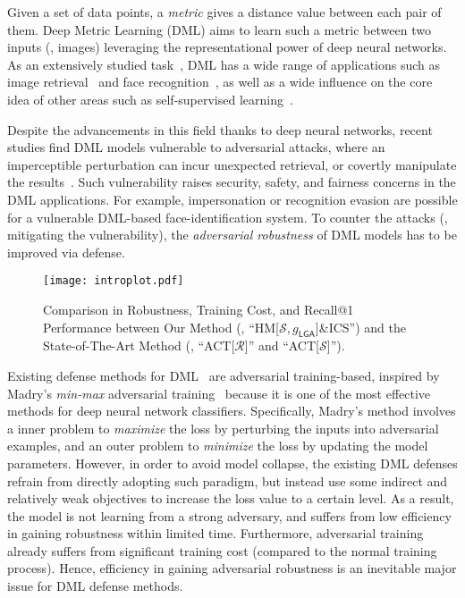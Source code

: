 \documentclass[10pt,twocolumn,letterpaper]{article}
\begin{document}

Given a set of data points, a \emph{metric} gives a distance value between each
pair of them.
%
Deep Metric Learning (DML) aims to learn such a metric between two inputs (\eg,
images) leveraging the representational power of deep neural networks.
%
As an extensively studied task~\cite{revisiting}, DML has a wide range of
applications such as image retrieval~\cite{imagesim2} and face
recognition~\cite{facenet,domainface}, as well as a wide influence on the core
idea of other areas such as self-supervised learning~\cite{dmlreality}.

Despite the advancements in this field thanks to deep neural
networks, recent studies find DML models vulnerable to
adversarial attacks, where an imperceptible perturbation can incur unexpected
retrieval, or covertly manipulate the results~\cite{advrank,advorder}.
%
Such vulnerability raises security, safety, and fairness concerns in the
DML applications.
%
For example, impersonation or recognition evasion are possible for a
vulnerable DML-based face-identification system.
%
To counter the attacks (\ie, mitigating the vulnerability), the
\emph{adversarial robustness} of DML models has to be improved via defense.

\begin{figure}[t]
	\texttt{[image: introplot.pdf]}
	\caption{
		Comparison in Robustness, Training Cost, and Recall@1 Performance
		between Our Method (\ie, ``HM[$\mathcal{S},g_\mathsf{LGA}$]\&ICS'')
		and the State-of-The-Art Method (\ie, ``ACT[$\mathcal{R}$]'' and
		``ACT[$\mathcal{S}$]'').
	}
	\label{fig:introplot}
\end{figure}


Existing defense methods for DML~\cite{advrank,robrank} are adversarial
training-based, inspired by Madry's \emph{min-max} adversarial
training~\cite{madry} because it is one of the most effective methods for deep
neural network classifiers.
%
Specifically, Madry's method involves a inner problem to \emph{maximize} the
loss by perturbing the inputs into adversarial examples, and an outer problem
to \emph{minimize} the loss by updating the model parameters.
%
However, in order to avoid model collapse, the existing DML defenses refrain
from directly adopting such paradigm, but instead use some indirect and
relatively weak objectives to increase the loss value to a certain level.
%
As a result, the model is not learning from a strong adversary, and suffers
from low efficiency in gaining robustness within limited time. 
%
Furthermore, adversarial training already suffers from significant training
cost (compared to the normal training process).
%
Hence, efficiency in gaining adversarial robustness is an inevitable major
issue for DML defense methods.
\end{document}
